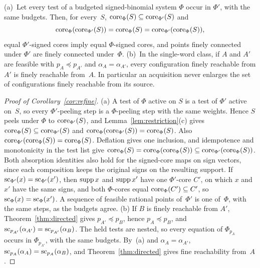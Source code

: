 \begin{corollary}\label{cor:refine}
(a)~Let every test of a budgeted signed-binomial system $\Phi$ occur in
$\Phi'$, with the same budgets. Then, for every~$S$,
$\operatorname{core}_\Phi(S)\subseteq\operatorname{core}_{\Phi'}(S)$ and
\[
  \operatorname{core}_\Phi(\operatorname{core}_{\Phi'}(S))=\operatorname{core}_\Phi(S)=\operatorname{core}_{\Phi'}(\operatorname{core}_\Phi(S)),
\]
equal $\Phi'$-signed cores imply equal $\Phi$-signed cores,
and points finely connected under $\Phi'$ are finely connected
under~$\Phi$.
(b)~In the single-word class, if $A$ and $A'$ are feasible with
$p_A\preceq p_{A'}$ and $\alpha_A=\alpha_{A'}$, every configuration finely
reachable from $A'$ is finely reachable from~$A$. In particular an
acquisition never enlarges the set of configurations finely reachable from
its source.
\end{corollary}

\begin{proof}[Proof of Corollary~\ref{cor:refine}]
(a) A test of $\Phi$ active on $S$ is a test of $\Phi'$ active on~$S$, so
every $\Phi'$-peeling step is a $\Phi$-peeling step with the same weights.
Hence $S$ peels under $\Phi$ to $\operatorname{core}_{\Phi'}(S)$, and
Lemma~\ref{lem:restriction}(c) gives
$\operatorname{core}_\Phi(S)\subseteq\operatorname{core}_{\Phi'}(S)$ and
$\operatorname{core}_\Phi(\operatorname{core}_{\Phi'}(S))=\operatorname{core}_\Phi(S)$.
Also \(\operatorname{core}_{\Phi'}(\operatorname{core}_\Phi(S))=\operatorname{core}_\Phi(S)\). Deflation gives one
inclusion, and idempotence and monotonicity in the test list give
\(\operatorname{core}_\Phi(S)=\operatorname{core}_\Phi(\operatorname{core}_\Phi(S))\subseteq\operatorname{core}_{\Phi'}(\operatorname{core}_\Phi(S))\).
Both absorption identities also hold for the signed-core maps on sign
vectors, since each composition keeps the original signs on the resulting
support. If
$\operatorname{sc}_{\Phi'}(x)=\operatorname{sc}_{\Phi'}(x')$, then $\operatorname{supp} x$ and $\operatorname{supp} x'$ have one
$\Phi'$-core $C'$, on which $x$ and $x'$ have the same signs, and both
$\Phi$-cores equal $\operatorname{core}_\Phi(C')\subseteq C'$, so
$\operatorname{sc}_\Phi(x)=\operatorname{sc}_\Phi(x')$. A sequence of feasible rational points
of~$\Phi'$ is one of~$\Phi$, with the same steps, as the budgets agree.
(b) If $B$ is finely reachable from $A'$, Theorem~\ref{thm:directed}
gives $p_{A'}\preceq p_B$, hence $p_A\preceq p_B$, and
$\operatorname{sc}_{p_{A'}}(\alpha_{A'})=\operatorname{sc}_{p_{A'}}(\alpha_B)$. The held tests are
nested, so every equation of $\Phi_{p_A}$ occurs in $\Phi_{p_{A'}}$, with
the same budgets. By~(a) and $\alpha_A=\alpha_{A'}$,
$\operatorname{sc}_{p_A}(\alpha_A)=\operatorname{sc}_{p_A}(\alpha_B)$, and Theorem~\ref{thm:directed}
gives fine reachability from~$A$.
\end{proof}


